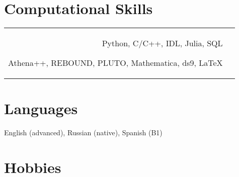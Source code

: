 \documentclass[10pt]{article} %
\begin{document}
\begin{paracol}{1}




\section{Computational Skills} 





\begin{supertabular}{rl} %

	
	
	
	{} %
	{Python, C/C++, IDL, Julia, SQL} %
	{} %
	{} %
	{}
	
	
	{} %
	{Athena++, REBOUND, PLUTO, Mathematica, ds9, \LaTeX} %
	{} %
	{} %
	{}
	

\end{supertabular}
\section{Languages}
English (advanced), Russian (native), Spanish (B1)
\section{Hobbies} 


\end{paracol}
\end{document}
